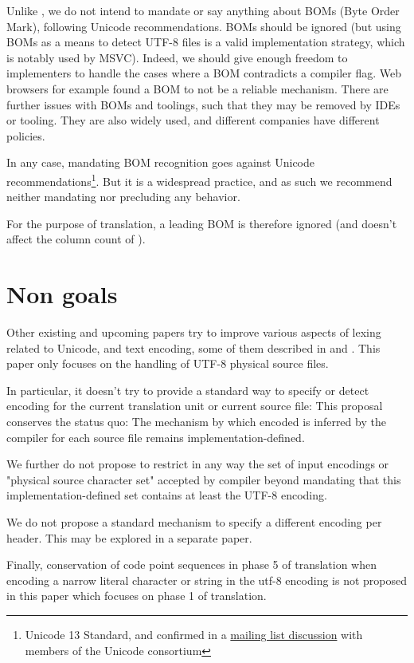 \documentclass{wg21}
\begin{document}
Unlike , we do not intend to mandate or say anything about BOMs (Byte Order Mark), following Unicode recommendations.
BOMs should be ignored (but using BOMs as a means to detect UTF-8 files is a valid implementation strategy, which is notably used by MSVC).
Indeed, we should give enough freedom to implementers to handle the cases where a BOM contradicts a compiler flag.
Web browsers for example found a BOM to not be a reliable mechanism.
There are further issues with BOMs and toolings, such that they may be removed by IDEs or tooling.
They are also widely used, and different companies have different policies.

In any case, mandating BOM recognition goes against Unicode recommendations\footnote{Unicode 13 Standard, and confirmed in a \href{https://corp.unicode.org/mailman/private/unicode/2020-June/008716.html}{mailing list discussion} with members of the Unicode consortium}. But it is a widespread practice, and as such we recommend neither mandating nor precluding any behavior.

For the purpose of translation, a leading BOM is therefore ignored (and doesn't affect the column count of ).

\section{Non goals}

Other existing and upcoming papers try to improve various aspects of lexing related to Unicode, and text encoding, some of them described in 
and .
This paper only focuses on the handling of UTF-8 physical source files.

In particular, it doesn't try to provide a standard  way to specify or detect encoding for the current translation unit or current source file:
This proposal conserves the status quo: The mechanism by which encoded is inferred by the compiler for each source file remains implementation-defined.

We further do not propose to restrict in any way the set of input encodings or "physical source character set"
accepted by compiler beyond mandating that this implementation-defined set contains at least the UTF-8 encoding.

We do not propose a standard mechanism to specify a different encoding per header. This may be explored in a separate paper.

Finally, conservation of code point sequences in phase 5 of translation when encoding a narrow literal character or string in the utf-8
encoding is not proposed in this paper which focuses on phase 1 of translation.
\end{document}
